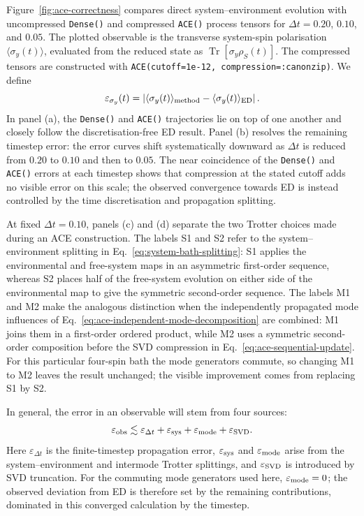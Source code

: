 Figure~\ref{fig:ace-correctness} compares direct system--environment evolution with uncompressed \texttt{Dense()} and compressed \texttt{ACE()} process tensors for $\Delta t=0.20$, $0.10$, and $0.05$.
The plotted observable is the transverse system-spin polarisation $\langle\sigma_y(t)\rangle$, evaluated from the reduced state as $\operatorname{Tr}[\sigma_y\rho_S(t)]$.
The compressed tensors are constructed with \texttt{ACE(cutoff=1e-12, compression=:canonzip)}.
We define
%
\begin{equation}
    \varepsilon_{\sigma_y}(t)=
    \left|\langle\sigma_y(t)\rangle_{\rm method}
    -\langle\sigma_y(t)\rangle_{\rm ED}\right|.
    \label{eq:ace-observable-error}
\end{equation}
%
In panel (a), the \texttt{Dense()} and \texttt{ACE()} trajectories lie on top of one another and closely follow the discretisation-free ED result.
Panel (b) resolves the remaining timestep error: the error curves shift systematically downward as $\Delta t$ is reduced from $0.20$ to $0.10$ and then to $0.05$.
The near coincidence of the \texttt{Dense()} and \texttt{ACE()} errors at each timestep shows that compression at the stated cutoff adds no visible error on this scale; the observed convergence towards ED is instead controlled by the time discretisation and propagation splitting.

At fixed $\Delta t=0.10$, panels (c) and (d) separate the two Trotter choices made during an ACE construction.
The labels S1 and S2 refer to the system--environment splitting in Eq.~\eqref{eq:system-bath-splitting}: S1 applies the environmental and free-system maps in an asymmetric first-order sequence, whereas S2 places half of the free-system evolution on either side of the environmental map to give the symmetric second-order sequence.
The labels M1 and M2 make the analogous distinction when the independently propagated mode influences of Eq.~\eqref{eq:ace-independent-mode-decomposition} are combined: M1 joins them in a first-order ordered product, while M2 uses a symmetric second-order composition before the SVD compression in Eq.~\eqref{eq:ace-sequential-update}.
For this particular four-spin bath the mode generators commute, so changing M1 to M2 leaves the result unchanged; the visible improvement comes from replacing S1 by S2.

In general, the error in an observable will stem from four sources:
%
\begin{equation}
    \varepsilon_{\rm obs}\lesssim
    \varepsilon_{\Delta t}
    +\varepsilon_{\rm sys}
    +\varepsilon_{\rm mode}
    +\varepsilon_{\rm SVD}.
\end{equation}
%
Here \(\varepsilon_{\Delta t}\) is the finite-timestep propagation error, \(\varepsilon_{\rm sys}\) and \(\varepsilon_{\rm mode}\) arise from the system--environment and intermode Trotter splittings, and \(\varepsilon_{\rm SVD}\) is introduced by SVD truncation.
For the commuting mode generators used here, \(\varepsilon_{\rm mode}=0\); the observed deviation from ED is therefore set by the remaining contributions, dominated in this converged calculation by the timestep.

